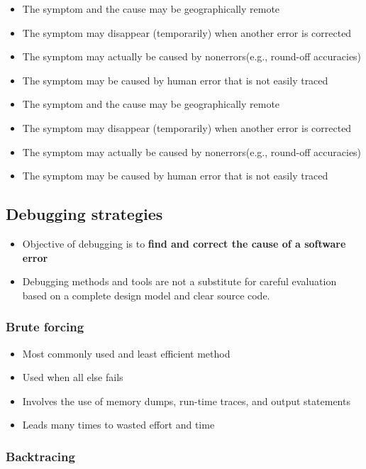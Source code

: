 \documentclass{article}
\begin{document}
\begin{itemize}
  \item The symptom and the cause may be geographically remote
  \item The symptom may disappear (temporarily) when another error is corrected 
  \item The symptom may actually be caused by nonerrors(e.g., round-off accuracies) 
  \item The symptom may be caused by human error that is not easily traced
  \item The symptom and the cause may be geographically remote 
  \item The symptom may disappear (temporarily) when another error is corrected 
  \item The symptom may actually be caused by nonerrors(e.g., round-off accuracies) 
  \item The symptom may be caused by human error that is not easily traced
\end{itemize}

\subsection{Debugging strategies}

\begin{itemize}
  \item Objective of debugging is to \textbf{find and correct the cause of a software error}
  \item Debugging methods and tools are not a substitute for careful evaluation based on a
complete design model and clear source code.
\end{itemize}

\subsubsection{Brute forcing}

\begin{itemize}
  \item Most commonly used and least efficient method 
  \item Used when all else fails 
  \item Involves the use of memory dumps, run-time traces, and output statements 
  \item Leads many times to wasted effort and time
\end{itemize}

\subsubsection{Backtracing}
\end{document}
